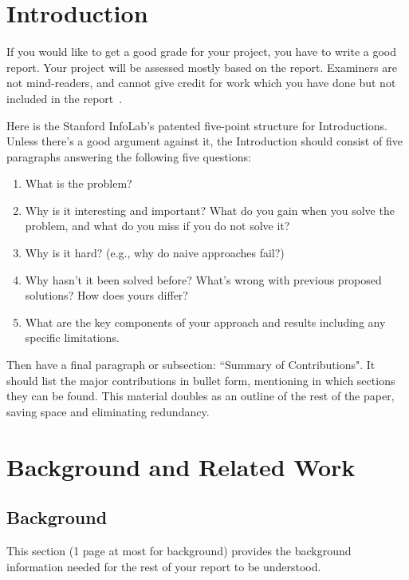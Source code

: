 \documentclass{winslabreport}
\begin{document}
\tableofcontents
\listoffigures
\listoftables
\body

\section{Introduction}

If you would like to get a good grade for your project, you have to write a good report.  Your project will be assessed mostly based on the report. Examiners are not mind-readers, and cannot give credit for work which you have done but not included in the report~\cite{York2017}.

Here is the Stanford InfoLab's patented five-point structure for Introductions. Unless there's a good argument against it, the Introduction should consist of five paragraphs answering the following five questions:
\begin{enumerate}
    \item What is the problem?
    \item Why is it interesting and important? What do you gain when you solve the problem, and what do you miss if you do not solve it?
    \item Why is it hard? (e.g., why do naive approaches fail?)
    \item Why hasn't it been solved before? What's wrong with previous proposed solutions? How does yours differ?
    \item What are the key components of your approach and results including any specific limitations.
\end{enumerate}

Then have a final paragraph or subsection: ``Summary of Contributions". It should list the major contributions in bullet form, mentioning in which sections they can be found. This material doubles as an outline of the rest of the paper, saving space and eliminating redundancy.


\section{Background and Related Work}

\subsection{Background}

This section (1 page at most for background) provides the background information needed for the rest of your report to be understood.
\end{document}
